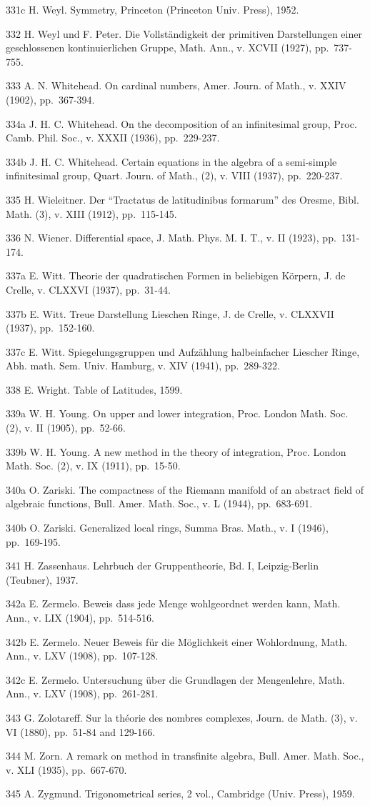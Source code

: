 331c H. Weyl. Symmetry, Princeton (Princeton Univ. Press), 1952.

332 H. Weyl und F. Peter. Die Vollständigkeit der primitiven Darstellungen einer geschlossenen kontinuierlichen Gruppe, Math. Ann., v. XCVII (1927), pp.~737-755.

333 A. N. Whitehead. On cardinal numbers, Amer. Journ. of Math., v. XXIV (1902), pp.~367-394.

334a J. H. C. Whitehead. On the decomposition of an infinitesimal group, Proc. Camb. Phil. Soc., v. XXXII (1936), pp.~229-237.

334b J. H. C. Whitehead. Certain equations in the algebra of a semi-simple infinitesimal group, Quart. Journ. of Math., (2), v. VIII (1937), pp.~220-237.

335 H. Wieleitner. Der ``Tractatus de latitudinibus formarum'' des Oresme, Bibl. Math. (3), v. XIII (1912), pp.~115-145.

336 N. Wiener. Differential space, J. Math. Phys. M. I. T., v. II (1923), pp.~131-174.

337a E. Witt. Theorie der quadratischen Formen in beliebigen Körpern, J. de Crelle, v. CLXXVI (1937), pp.~31-44.

337b E. Witt. Treue Darstellung Lieschen Ringe, J. de Crelle, v. CLXXVII (1937), pp.~152-160.

337c E. Witt. Spiegelungsgruppen und Aufzählung halbeinfacher Liescher Ringe, Abh. math. Sem. Univ. Hamburg, v. XIV (1941), pp.~289-322.

338 E. Wright. Table of Latitudes, 1599.

339a W. H. Young. On upper and lower integration, Proc. London Math. Soc. (2), v. II (1905), pp.~52-66.

339b W. H. Young. A new method in the theory of integration, Proc. London Math. Soc. (2), v. IX (1911), pp.~15-50.

340a O. Zariski. The compactness of the Riemann manifold of an abstract field of algebraic functions, Bull. Amer. Math. Soc., v. L (1944), pp.~683-691.

340b O. Zariski. Generalized local rings, Summa Bras. Math., v. I (1946), pp.~169-195.

341 H. Zassenhaus. Lehrbuch der Gruppentheorie, Bd. I, Leipzig-Berlin (Teubner), 1937.

342a E. Zermelo. Beweis dass jede Menge wohlgeordnet werden kann, Math. Ann., v. LIX (1904), pp.~514-516.

342b E. Zermelo. Neuer Beweis für die Möglichkeit einer Wohlordnung, Math. Ann., v. LXV (1908), pp.~107-128.

342c E. Zermelo. Untersuchung über die Grundlagen der Mengenlehre, Math. Ann., v. LXV (1908), pp.~261-281.

343 G. Zolotareff. Sur la théorie des nombres complexes, Journ. de Math. (3), v. VI (1880), pp.~51-84 and 129-166.

344 M. Zorn. A remark on method in transfinite algebra, Bull. Amer. Math. Soc., v. XLI (1935), pp.~667-670.

345 A. Zygmund. Trigonometrical series, 2 vol., Cambridge (Univ. Press), 1959.
